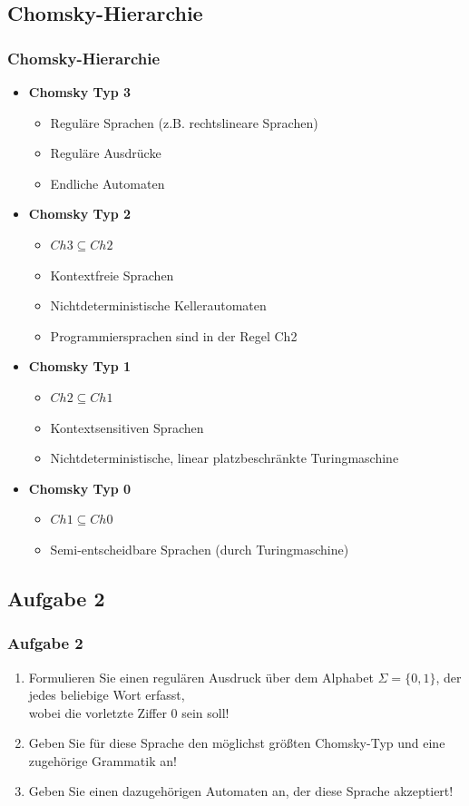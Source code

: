 \subsection{Chomsky-Hierarchie}
\begin{frame}
	\frametitle{Chomsky-Hierarchie}
	\begin{itemize}
		\item \textbf{Chomsky Typ 3}
		\begin{itemize}
			\item Reguläre Sprachen (z.B. rechtslineare Sprachen)
			\item Reguläre Ausdrücke
			\item Endliche Automaten
		\end{itemize}
		\item \textbf{Chomsky Typ 2}
		\begin{itemize}
			\item $Ch3 \subseteq Ch2$
			\item Kontextfreie Sprachen
			\item Nichtdeterministische Kellerautomaten
			\item Programmiersprachen sind in der Regel Ch2
		\end{itemize}
		\item \textbf{Chomsky Typ 1}
		\begin{itemize}
			\item $Ch2 \subseteq Ch1$
			\item Kontextsensitiven Sprachen
			\item Nichtdeterministische, linear platzbeschränkte Turingmaschine
		\end{itemize}
		\item \textbf{Chomsky Typ 0}
		\begin{itemize}
			\item $Ch1 \subseteq Ch0$
			\item Semi-entscheidbare Sprachen (durch Turingmaschine)
		\end{itemize}
	\end{itemize}
\end{frame}
\subsection{Aufgabe 2}
\begin{frame}
	\frametitle{Aufgabe 2}
	\begin{enumerate}
		\item Formulieren Sie einen regulären Ausdruck über dem Alphabet $\Sigma =
		\{0,1\}$, der jedes beliebige Wort erfasst,\\
		wobei die vorletzte Ziffer $0$ sein soll!
		\item Geben Sie für diese Sprache den möglichst größten Chomsky-Typ und eine
		zugehörige Grammatik an!
		\item Geben Sie einen dazugehörigen Automaten an, der diese Sprache akzeptiert!
	\end{enumerate}
\end{frame}

